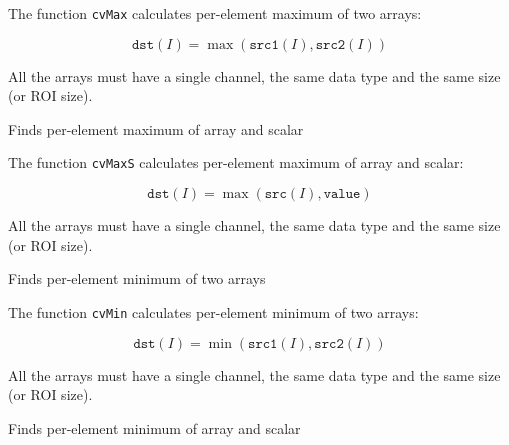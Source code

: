 The function \texttt{cvMax} calculates per-element maximum of two arrays:

\[
\texttt{dst}(I)=\max(\texttt{src1}(I), \texttt{src2}(I))
\]

All the arrays must have a single channel, the same data type and the same size (or ROI size).


\label{MaxS}

Finds per-element maximum of array and scalar


\begin{description}
\end{description}

The function \texttt{cvMaxS} calculates per-element maximum of array and scalar:

\[
\texttt{dst}(I)=\max(\texttt{src}(I), \texttt{value})
\]

All the arrays must have a single channel, the same data type and the same size (or ROI size).


\label{Min}

Finds per-element minimum of two arrays


\begin{description}
\end{description}


The function \texttt{cvMin} calculates per-element minimum of two arrays:

\[
\texttt{dst}(I)=\min(\texttt{src1}(I),\texttt{src2}(I))
\]

All the arrays must have a single channel, the same data type and the same size (or ROI size).


\label{MinS}

Finds per-element minimum of array and scalar


